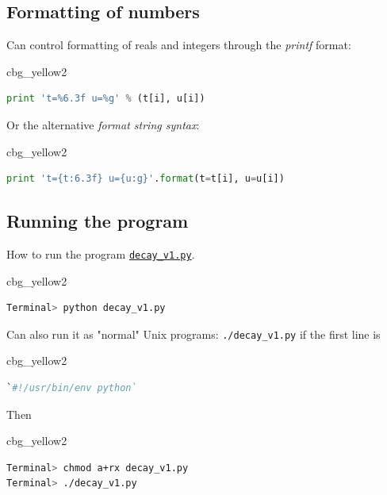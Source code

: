 \documentclass[%
oneside,                 %
final,                   %
10pt]{article}
\newenvironment{_cod_tight}[1]{
   \def\FrameCommand{\colorbox{#1}}
   \FrameRule0.6pt\MakeFramed {\FrameRestore}\vskip3mm}
   {\vskip0mm\endMakeFramed}
\newenvironment{cod}[1]{
\bgroup\rmfamily
\fboxsep=0mm\relax
\begin{_cod_tight}{#1}
\list{}{\parsep=-2mm\parskip=0mm\topsep=0pt\leftmargin=2mm
\rightmargin=2\leftmargin\leftmargin=4pt\relax}
\item\relax}
{\endlist\end{_cod_tight}\egroup}
\begin{document}
\subsection*{Formatting of numbers}

Can control formatting of reals and integers through the \emph{printf} format:

\begin{cod}{cbg_yellow2}\begin{lstlisting}[language=Python,style=simple,xleftmargin=2mm]
print 't=%6.3f u=%g' % (t[i], u[i])
\end{lstlisting}\end{cod}
\noindent

Or the alternative \emph{format string syntax}:
\begin{cod}{cbg_yellow2}\begin{lstlisting}[language=Python,style=simple,xleftmargin=2mm]
print 't={t:6.3f} u={u:g}'.format(t=t[i], u=u[i])
\end{lstlisting}\end{cod}
\noindent

\subsection*{Running the program}

How to run the program \href{{http://tinyurl.com/ofkw6kc/alg/decay_v1.py}}{\nolinkurl{decay_v1.py}}.

\begin{cod}{cbg_yellow2}\begin{lstlisting}[language=bash,style=simple,xleftmargin=2mm]
Terminal> python decay_v1.py
\end{lstlisting}\end{cod}
\noindent

Can also run it as "normal" Unix programs: \Verb!./decay_v1.py! if the
first line is

\begin{cod}{cbg_yellow2}\begin{lstlisting}[language=Python,style=simple,xleftmargin=2mm]
`#!/usr/bin/env python`
\end{lstlisting}\end{cod}
\noindent

Then
\begin{cod}{cbg_yellow2}\begin{lstlisting}[language=bash,style=simple,xleftmargin=2mm]
Terminal> chmod a+rx decay_v1.py
Terminal> ./decay_v1.py
\end{lstlisting}\end{cod}
\noindent
\end{document}
